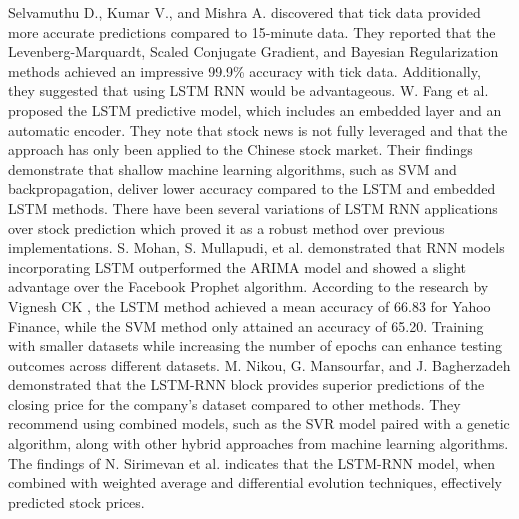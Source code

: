 Selvamuthu D., Kumar V., and Mishra A. \cite{selvamuthu2019indian} discovered that tick data provided more accurate predictions compared to 15-minute data. They reported that the Levenberg-Marquardt, Scaled Conjugate Gradient, and Bayesian Regularization methods achieved an impressive 99.9\% accuracy with tick data. Additionally, they suggested that using LSTM RNN would be advantageous. W. Fang et al. \cite{fang2019combine} proposed the LSTM predictive model, which includes an embedded layer and an automatic encoder. They note that stock news is not fully leveraged and that the approach has only been applied to the Chinese stock market. Their findings demonstrate that shallow machine learning algorithms, such as SVM and backpropagation, deliver lower accuracy compared to the LSTM and embedded LSTM methods. There have been several variations of LSTM RNN applications over stock prediction which proved it as a robust method over previous implementations. S. Mohan, S. Mullapudi, et al. \cite{mohan2019stock} demonstrated that RNN models incorporating LSTM outperformed the ARIMA model and showed a slight advantage over the Facebook Prophet algorithm. According to the research by Vignesh CK \cite{vignesh2018applying}, the LSTM method achieved a mean accuracy of 66.83 for Yahoo Finance, while the SVM method only attained an accuracy of 65.20. Training with smaller datasets while increasing the number of epochs can enhance testing outcomes across different datasets. M. Nikou, G. Mansourfar, and J. Bagherzadeh \cite{nikou2019stock} demonstrated that the LSTM-RNN block provides superior predictions of the closing price for the company's dataset compared to other methods. They recommend using combined models, such as the SVR model paired with a genetic algorithm, along with other hybrid approaches from machine learning algorithms. The findings of N. Sirimevan et al. \cite{sirimevan2019stock} indicates that the LSTM-RNN model, when combined with weighted average and differential evolution techniques, effectively predicted stock prices. 

